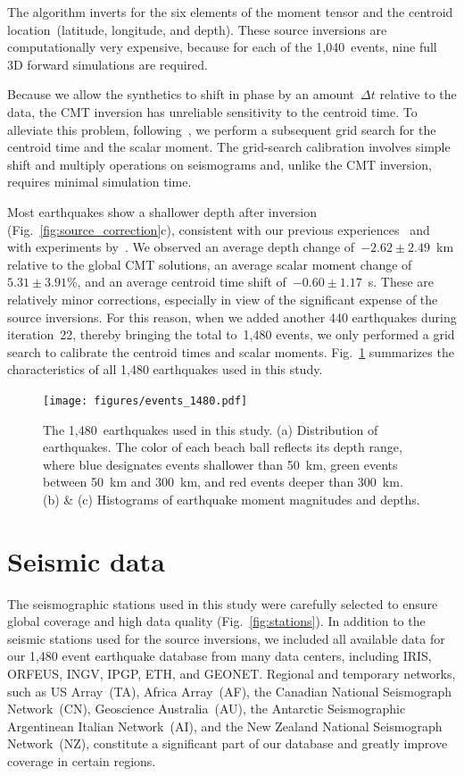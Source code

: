 \documentclass[extra,mreferee]{gji}
\begin{document}
The algorithm inverts for the six elements of the moment tensor
and the centroid location~(latitude, longitude, and depth).
These source inversions are computationally very expensive,
because for each of the 1,040~events, nine full 3D forward simulations are required.

Because we allow the synthetics to shift in phase by an amount~$\Delta t$ relative to the data,
the CMT inversion has unreliable sensitivity to the centroid time.
To alleviate this problem,
following~\cite{zhu2012structure},
we perform a subsequent grid search for the centroid time and the scalar moment.
The grid-search calibration involves simple shift and multiply operations on seismograms
and, unlike the CMT inversion, requires minimal simulation time.

Most earthquakes show a shallower depth after inversion
(Fig.~\ref{fig:source_correction}c),
consistent with our previous experiences~\citep[e.g.,][]{zhu2015seismic,chen2015multiparameter,bozdaug2016global} and with experiments by~\cite{hjorleifsdottir2010effects}.
We observed an average depth change of~$-2.62\pm2.49$~km relative to the global CMT solutions,
an average scalar moment change of~$5.31\pm3.91$\%,
and an average centroid time shift of~$-0.60\pm1.17$~s.
These are relatively minor corrections, especially in view of the significant expense of the source inversions.
For this reason, when we added another 440 earthquakes during iteration~22,
thereby bringing the total to~1,480 events,
we only performed a grid search to calibrate the centroid times and scalar moments.
Fig.~\ref{fig:event_1480} summarizes the characteristics of all 1,480 earthquakes used in this study.

\begin{figure}
  \centering
  \texttt{[image: figures/events\_1480.pdf]}
  \caption{The 1,480~earthquakes used in this study. (a) Distribution of earthquakes. The color of each beach ball reflects its depth range, where blue designates events shallower than 50~km, green events between 50~km and 300~km, and red events deeper than 300~km. (b) \& (c) Histograms of earthquake moment magnitudes and depths.}
  \label{fig:event_1480}
\end{figure}


\section{Seismic data}
\label{section:data}

The seismographic stations used in this study were carefully selected to ensure global coverage
and high data quality (Fig.~\ref{fig:stations}).
In addition to the seismic stations used for the source inversions,
we included all available data for our 1,480 event earthquake database from many data centers,
including IRIS, ORFEUS, INGV, IPGP, ETH, and GEONET.
Regional and temporary networks,
such as US Array~(TA),
Africa Array~(AF), the Canadian National Seismograph Network~(CN), Geoscience Australia~(AU),
the Antarctic Seismographic Argentinean Italian Network~(AI),
and the New Zealand National Seismograph Network~(NZ),
constitute a significant part
of our database and greatly improve coverage in certain regions.
\end{document}
